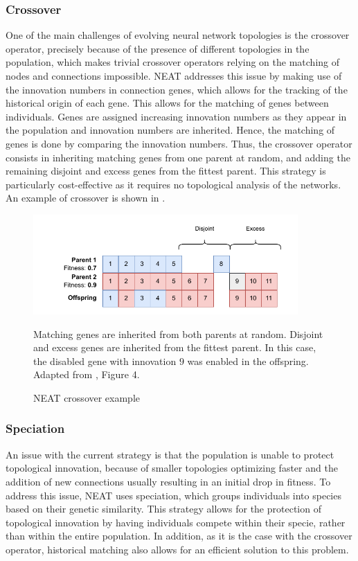 \subsubsection{Crossover}

One of the main challenges of evolving neural network topologies is the crossover operator, precisely because of the presence of different topologies in the population,
which makes trivial crossover operators relying on the matching of nodes and connections impossible.
NEAT addresses this issue by making use of the innovation numbers in connection genes, which allows for the tracking of the historical origin of each gene. This allows
for the matching of genes between individuals. Genes are assigned increasing innovation numbers as they appear in the population and innovation numbers are inherited.
Hence, the matching of genes is done by comparing the innovation numbers. Thus, the crossover operator consists in inheriting matching genes from one parent at random,
and adding the remaining disjoint and excess genes from the fittest parent. This strategy is particularly cost-effective as it requires no topological analysis of the networks.
An example of crossover is shown in .

\begin{figure}
    \centering
    \includegraphics[width=0.9\textwidth]{Pictures/neat_crossover}
    \caption{NEAT crossover example}{Matching genes are inherited from both parents at random. Disjoint and excess genes are inherited from the fittest parent. In this case, the
    disabled gene with innovation $9$ was enabled in the offspring. Adapted from \cite{neat}, Figure 4.}
    \label{fig:neat_crossover}
\end{figure}

\subsubsection{Speciation}

An issue with the current strategy is that the population is unable to protect topological innovation, because of smaller topologies optimizing faster and the
addition of new connections usually resulting in an initial drop in fitness. To address this issue, NEAT uses speciation, which groups individuals into species based
on their genetic similarity. This strategy allows for the protection of topological innovation by having individuals compete within their specie, rather than within the
entire population. In addition, as it is the case with the crossover operator, historical matching also allows for an efficient solution to this problem.


